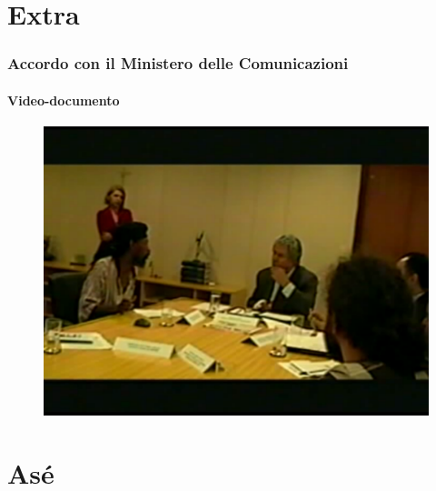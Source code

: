 \documentclass{beamer}
\begin{document}
\section{Extra}

\begin{frame}
  \frametitle{Accordo con il Ministero delle Comunicazioni}
  \framesubtitle{Video-documento}
	\begin{figure}
		\includegraphics[height=0.6\textheight]{./Figure/videomc.pdf}
	\end{figure}

 \end{frame}

\section{Asé}
\end{document}
